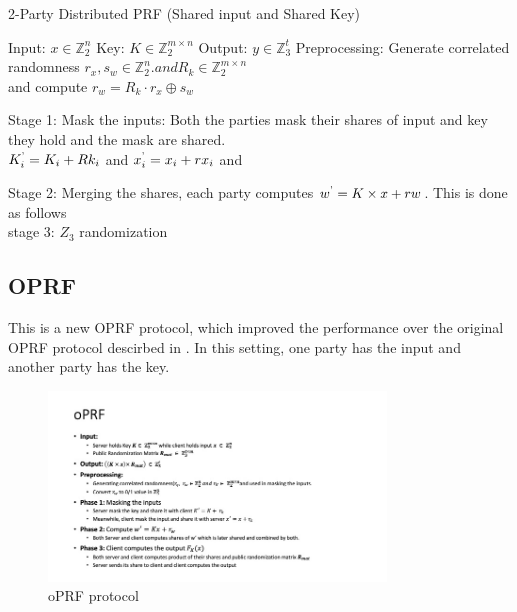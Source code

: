 \begin{algorithm}
	\caption{2-Party Distributed PRF (Shared input and Shared Key)}
	\begin{algorithmic}
		\STATE Input: $x \in \mathbb{Z}_{2}^{n}$
		\STATE Key: $K \in \mathbb{Z}_{2}^{m \times n}$
		\STATE Output: $y \in \mathbb{Z}_{3}^{t}$
		\STATE Preprocessing: Generate correlated randomness $r_{x}, s_{w} \in \mathbb{Z}_{2}^{n}. and R_{k} \in \mathbb{Z}_{2}^{m \times n}$\\
		and compute $ r_{w} = R_{k} \cdot r_{x} \oplus s_{w}$
		
		\STATE Stage 1: Mask the inputs: Both the parties mask their shares of input and key they hold and the mask are shared.\\
		$K_{i}^{\textrm'} = K_{i} + Rk_{i}$ and 
		$x_{i}^{\textrm'} = x_{i} + rx_{i}$ and 
		
		
		\STATE Stage 2: Merging the shares, each party computes $w^{\textrm'} = K \times x + rw$. This is done as follows\\
		
		
		\STATE stage 3: $Z_3$ randomization  
		
	\end{algorithmic}
\end{algorithm}





\subsection{OPRF}
This is a new OPRF protocol, which improved the performance over the original OPRF protocol descirbed in \cite{darkmatter}. In this setting, one party has the input and another party has the key.

\begin{figure}[ht]
	\centering
	\includegraphics[width=0.8\textwidth]{images/oprf.jpg}
	\vspace{-2mm}
	\caption{oPRF protocol}
	\label{oprf.fig}
	\vspace{-5mm}
\end{figure}


